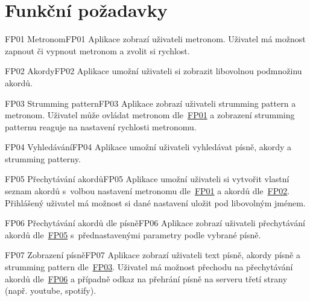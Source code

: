 \section{Funkční požadavky}
\label{sc:functional_req}

\begin{requirment}{FP01 Metronom}{FP01}
    Aplikace zobrazí uživateli metronom. Uživatel má možnost zapnout či vypnout metronom a zvolit si rychlost.
\end{requirment}

\begin{requirment}{FP02 Akordy}{FP02}
    Aplikace umožní uživateli si zobrazit libovolnou podmnožinu akordů.
\end{requirment}

\begin{requirment}{FP03 Strumming pattern}{FP03}
    Aplikace zobrazí uživateli strumming pattern a metronom. Uživatel může ovládat metronom dle~\hyperref[FP01]{FP01} a zobrazení strumming patternu reaguje na nastavení rychlosti metronomu.
\end{requirment}

\begin{requirment}{FP04 Vyhledávání}{FP04}
    Aplikace umožní uživateli vyhledávat písně, akordy a strumming patterny.
\end{requirment}

\begin{requirment}{FP05 Přechytávání akordů}{FP05}
    Aplikace umožní uživateli si vytvořit vlastní seznam akordů s~volbou nastavení metronomu dle~\hyperref[FP01]{FP01} a akordů dle~\hyperref[FP02]{FP02}.
    Přihlášený uživatel má možnost si dané nastavení uložit pod libovolným jménem.
\end{requirment}

\begin{requirment}{FP06 Přechytávání akordů dle písně}{FP06}
    Aplikace zobrazí uživateli přechytávání akordů dle~\hyperref[FP05]{FP05} s~přednastavenými parametry podle vybrané písně.
\end{requirment}

\begin{requirment}{FP07 Zobrazení písně}{FP07}
    Aplikace zobrazí uživateli text písně, akordy písně a strumming pattern dle~\hyperref[FP03]{FP03}. Uživatel má možnost přechodu na přechytávání akordů dle~\hyperref[FP06]{FP06} a případně odkaz na přehrání písně na serveru třetí strany (např. youtube, spotify).
\end{requirment}

